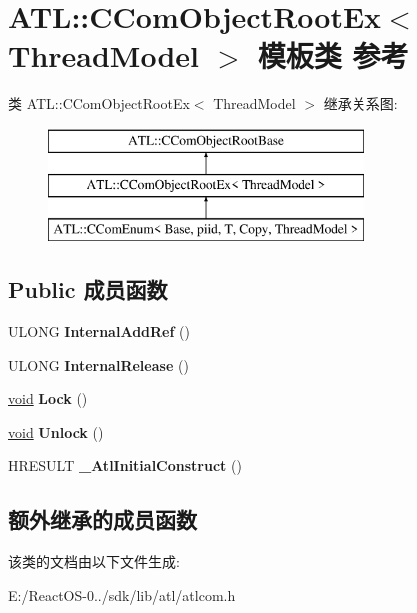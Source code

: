 \hypertarget{class_a_t_l_1_1_c_com_object_root_ex}{}\section{A\+TL\+:\+:C\+Com\+Object\+Root\+Ex$<$ Thread\+Model $>$ 模板类 参考}
\label{class_a_t_l_1_1_c_com_object_root_ex}
类 A\+TL\+:\+:C\+Com\+Object\+Root\+Ex$<$ Thread\+Model $>$ 继承关系图\+:\begin{figure}[H]
\begin{center}
\leavevmode
\includegraphics[height=3.000000cm]{class_a_t_l_1_1_c_com_object_root_ex}
\end{center}
\end{figure}
\subsection*{Public 成员函数}
\begin{DoxyCompactItemize}
\item 
\mbox{\label{class_a_t_l_1_1_c_com_object_root_ex_a68839ee7fdd1a4a602487940e9a4c9fd}} 
U\+L\+O\+NG {\bfseries Internal\+Add\+Ref} ()
\item 
\mbox{\label{class_a_t_l_1_1_c_com_object_root_ex_a99704904274593f3874f89a3efd92df3}} 
U\+L\+O\+NG {\bfseries Internal\+Release} ()
\item 
\mbox{\label{class_a_t_l_1_1_c_com_object_root_ex_af7abff018a25eccbf6f23c486ab837f0}} 
\hyperlink{interfacevoid}{void} {\bfseries Lock} ()
\item 
\mbox{\label{class_a_t_l_1_1_c_com_object_root_ex_ad8716d67ef6c4ed58801420df1f7bc9b}} 
\hyperlink{interfacevoid}{void} {\bfseries Unlock} ()
\item 
\mbox{\label{class_a_t_l_1_1_c_com_object_root_ex_a0dfacc80f7ab67ffe854a01d61851267}} 
H\+R\+E\+S\+U\+LT {\bfseries \+\_\+\+Atl\+Initial\+Construct} ()
\end{DoxyCompactItemize}
\subsection*{额外继承的成员函数}


该类的文档由以下文件生成\+:\begin{DoxyCompactItemize}
\item 
E\+:/\+React\+O\+S-\/0../sdk/lib/atl/atlcom.\+h\end{DoxyCompactItemize}
